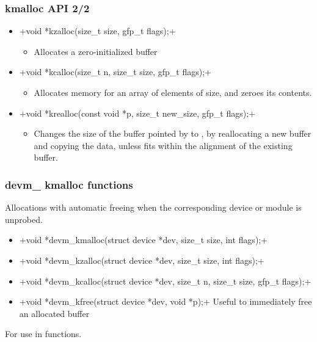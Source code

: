 \begin{frame}[fragile]
  \frametitle{kmalloc API 2/2}
  \begin{itemize}
  \item {}+void *kzalloc(size_t size, gfp_t flags);+
    \begin{itemize}
    \item Allocates a zero-initialized buffer
    \end{itemize}
  \item {}+void *kcalloc(size_t n, size_t size, gfp_t flags);+
    \begin{itemize}
    \item Allocates memory for an array of  elements of
       size, and zeroes its contents.
    \end{itemize}
  \item {\footnotesize {}+void *krealloc(const void *p, size_t new_size, gfp_t flags);+}
    \begin{itemize}
    \item Changes the size of the buffer pointed by  to
      , by reallocating a new buffer and copying the
      data, unless  fits within the alignment of
      the existing buffer.
    \end{itemize}
  \end{itemize}
\end{frame}

\begin{frame}
  \frametitle{devm\_ kmalloc functions}
  Allocations with automatic freeing when the corresponding device or module is unprobed.
  \begin{itemize}
  \scriptsize
  \item {}+void *devm_kmalloc(struct device *dev, size_t size, int flags);+
  \item {}+void *devm_kzalloc(struct device *dev, size_t size, int flags);+
  \item {}+void *devm_kcalloc(struct device *dev, size_t n, size_t size, gfp_t flags);+
  \item {}+void *devm_kfree(struct device *dev, void *p);+
        Useful to immediately free an allocated buffer
  \end{itemize}
  \normalsize
  For use in  functions.
\end{frame}

